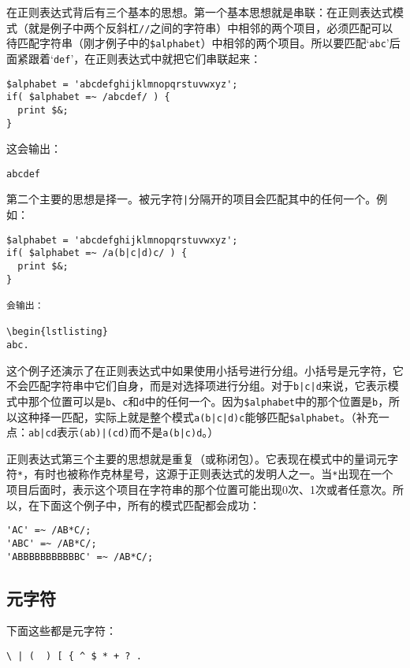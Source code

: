 在正则表达式背后有三个基本的思想。第一个基本思想就是串联：在正则表达式模式（就是例子中两个反斜杠\verb|//|之间的字符串）中相邻的两个项目，必须匹配可以待匹配字符串（刚才例子中的\verb|$alphabet|）中相邻的两个项目。所以要匹配`\verb|abc|'后面紧跟着`\verb|def|'，在正则表达式中就把它们串联起来：

\begin{lstlisting}
$alphabet = 'abcdefghijklmnopqrstuvwxyz';
if( $alphabet =~ /abcdef/ ) {
  print $&; 
}
\end{lstlisting}

这会输出：

\begin{lstlisting}
abcdef
\end{lstlisting}

第二个主要的思想是择一。被元字符\verb=|=分隔开的项目会匹配其中的任何一个。例如：

\begin{lstlisting}
$alphabet = 'abcdefghijklmnopqrstuvwxyz';
if( $alphabet =~ /a(b|c|d)c/ ) {
  print $&;
}

会输出：

\begin{lstlisting}
abc.
\end{lstlisting}

这个例子还演示了在正则表达式中如果使用小括号进行分组。小括号是元字符，它不会匹配字符串中它们自身，而是对选择项进行分组。对于\verb=b|c|d=来说，它表示模式中那个位置可以是\verb|b|、\verb|c|和\verb|d|中的任何一个。因为\verb|$alphabet|中的那个位置是\verb|b|，所以这种择一匹配，实际上就是整个模式\verb=a(b|c|d)c=能够匹配\verb|$alphabet|。（补充一点：\verb=ab|cd=表示\verb=(ab)|(cd)=而不是\verb=a(b|c)d=。）

正则表达式第三个主要的思想就是重复（或称闭包）。它表现在模式中的量词元字符\verb|*|，有时也被称作克林星号，这源于正则表达式的发明人之一。当\verb|*|出现在一个项目后面时，表示这个项目在字符串的那个位置可能出现0次、1次或者任意次。所以，在下面这个例子中，所有的模式匹配都会成功：

\begin{lstlisting}
'AC' =~ /AB*C/;
'ABC' =~ /AB*C/;
'ABBBBBBBBBBBC' =~ /AB*C/;
\end{lstlisting}

\subsection{元字符}
下面这些都是元字符：

\begin{lstlisting}
\ | (  ) [ { ^ $ * + ? .
\end{lstlisting}

